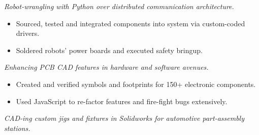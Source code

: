 \documentclass{resume}
\begin{document}
\textit{Robot-wrangling with Python over distributed communication architecture.}
\begin{itemize}
  \item Sourced, tested and integrated components into system via custom-coded drivers.
  \item Soldered robots' power boards and executed safety bringup.
\end{itemize}
\begin{comment}
  Informal intro to ML / N-nets, FK / IK, Grasping, FSM, DB (ES)
  People skills: pair-programming, 1-on-1, standups, blog posts, Happy Hour, AI planning, CI for internal processes, HW concept review
  Python fu: rapid prototyping / scripting AND enterprise-level code --> classes, exception-handling, logging, PDB debugging, linting, documentation
\end{comment}

\textit{Enhancing PCB CAD features in hardware and software avenues.}
\begin{itemize}
    \item Created and verified symbols and footprints for 150+ electronic components.
    \item Used JavaScript to re-factor features and fire-fight bugs extensively.
\end{itemize}
\begin{comment}
  Adjusted prioritization of design rules in layout constraint manager.
  Fixed incorrect drawing and positioning of constraint violation layout bodies.
  Re-factored event-listening logic for drawing nets in schematic editor.
  Corrected pin manager's oversight in tracking connection mappings.
  Enabled efficient BGA row enumeration during footprint generation.
\end{comment}

\textit{CAD-ing custom jigs and fixtures in Solidworks for automotive part-assembly stations.}
\begin{comment}
\begin{itemize}
  \item Modeled custom tooling in two assembly stations for a vehicle's seat track mechanism. %
  \item Detailed and ballooned numerous part and assembly drawings.
\end{itemize}
\end{comment}
\end{document}
